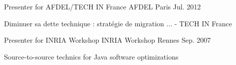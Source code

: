 

\begin{cventries}

  \cventry
    {Presenter for AFDEL/TECH IN France} %
    {AFDEL} %
    {Paris} %
    {Jul. 2012} %
    {
      \begin{cvitems} %
        \item {Diminuer sa dette technique : stratégie de migration ... - TECH IN France}
      \end{cvitems}
    }

  \cventry
    {Presenter for INRIA Workshop} %
    {INRIA Workshop} %
    {Rennes} %
    {Sep. 2007} %
    {
      \begin{cvitems} %
        \item {Source-to-source technics for Java software optimizations}
      \end{cvitems}
    }

\end{cventries}
